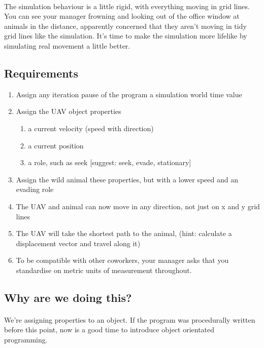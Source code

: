 \documentclass[11pt]{book}
\begin{document}
\paragraph{}  The simulation behaviour is a little rigid, with everything moving in grid lines. You can see your manager frowning and looking out of the office window at animals in the distance, apparently concerned that they aren't moving in tidy grid lines like the simulation. It's time to make the simulation more lifelike by simulating real movement a little better.

\subsection{Requirements}
\begin{enumerate}
\item Assign any iteration pause of the program a simulation world time value
\item Assign the UAV object properties
    \begin{enumerate}
    \item a current velocity (speed with direction)
    \item a current position
    \item a role, such as seek [suggest: seek, evade, stationary]
    \end{enumerate}
\item Assign the wild animal these properties, but with a lower speed and an evading role
\item The UAV and animal can now move in any direction, not just on x and y grid lines
\item The UAV will take the shortest path to the animal, (hint: calculate a displacement vector and travel along it)
\item To be compatible with other coworkers, your manager asks that you standardise on metric units of measurement throughout.
\end{enumerate}

\subsection{Why are we doing this?}

\paragraph{} We're assigning properties to an object. If the program was procedurally written before this point, now is a good time to introduce object orientated programming.
\end{document}

